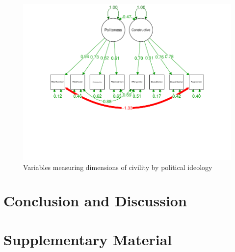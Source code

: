 \documentclass{article}
\begin{document}
\begin{figure}[H]
    \centering
    \includegraphics[width=1\linewidth]{figures/16_FA_PolitenessConstructive.pdf}
    \caption{Variables measuring dimensions of civility by political ideology}
    \label{fig:civility-ideology}
\end{figure}




\section{Conclusion and Discussion}


\newpage



\clearpage
\section{Supplementary Material}
\end{document}
